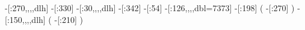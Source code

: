              -[:270,,,,dlh]%
                    -[:330]%
              -[:30,,,,dlh]%
                    -[:342]%
                     -[:54]%
    -[:126,,,,dbl={73}{73}]%
                    -[:198]%
                              (
                        -[:270]%
                              )
             -[:150,,,,dlh]%
                              (
                        -[:210]%
                              )